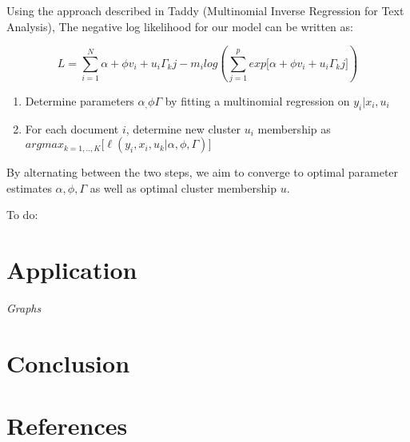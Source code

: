 \documentclass[]{article}
\begin{document}
Using the approach described in Taddy (Multinomial Inverse Regression
for Text Analysis), The negative log likelihood for our model can be
written as:

\[L = \sum_{i = 1}^{N}{\alpha + \phi v_i + u_i \Gamma_kj} - m_i log(\sum_{j = 1}^{p}{exp{\big[ \alpha + \phi v_i + u_i \Gamma_kj \big]}})\]

\begin{enumerate}
\def\labelenumi{\arabic{enumi}.}
\itemsep1pt\parskip0pt
\item
  Determine parameters $\alpha_, \phi \Gamma$ by fitting a multinomial
  regression on $y_i | x_i , u_i$
\item
  For each document $i$, determine new cluster $u_i$ membership as
  $argmax_{k = 1,..,K} \big[  \ell(y_i,x_i,u_k | \alpha, \phi, \Gamma) \big]$
\end{enumerate}

By alternating between the two steps, we aim to converge to optimal
parameter estimates $\alpha, \phi, \Gamma$ as well as optimal cluster
membership $u$.

To do:

\section{Application}\label{application}

\emph{Graphs}

\section{Conclusion}\label{conclusion}

\section{References}\label{references}
\end{document}
